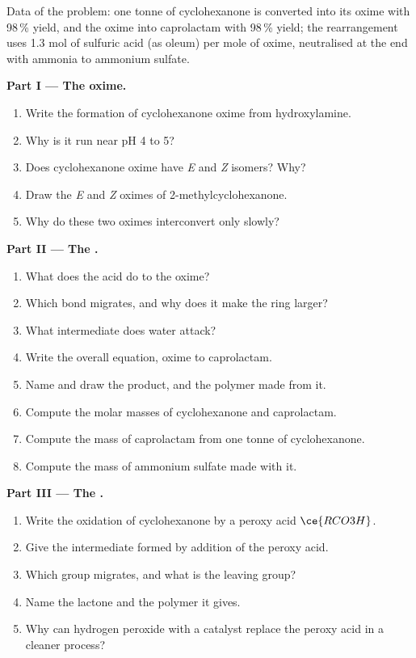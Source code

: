 \begin{problem}
\label{pb:b3:radicals-carbenes:1}
Data of the problem: one tonne of cyclohexanone is converted into its oxime with
98\,\% yield, and the oxime into caprolactam with 98\,\% yield; the rearrangement uses
1.3 mol of sulfuric acid (as oleum) per mole of oxime, neutralised at the end with
ammonia to ammonium sulfate.

\medskip\noindent\textbf{Part I --- The oxime.}
\begin{enumerate}
  \item Write the formation of cyclohexanone oxime from hydroxylamine.
  \item Why is it run near pH 4 to 5?
  \item Does cyclohexanone oxime have \textit{E} and \textit{Z} isomers? Why?
  \item Draw the \textit{E} and \textit{Z} oximes of 2-methylcyclohexanone.
  \item Why do these two oximes interconvert only slowly?
\end{enumerate}

\medskip\noindent\textbf{Part II --- The .}
\begin{enumerate}[resume]
  \item What does the acid do to the oxime?
  \item Which bond migrates, and why does it make the ring larger?
  \item What intermediate does water attack?
  \item Write the overall equation, oxime to caprolactam.
  \item Name and draw the product, and the polymer made from it.
  \item Compute the molar masses of cyclohexanone and caprolactam.
  \item Compute the mass of caprolactam from one tonne of cyclohexanone.
  \item Compute the mass of ammonium sulfate made with it.
\end{enumerate}

\medskip\noindent\textbf{Part III --- The .}
\begin{enumerate}[resume]
  \item Write the oxidation of cyclohexanone by a peroxy acid $\ce{RCO3H}$.
  \item Give the intermediate formed by addition of the peroxy acid.
  \item Which group migrates, and what is the leaving group?
  \item Name the lactone and the polymer it gives.
  \item Why can hydrogen peroxide with a catalyst replace the peroxy acid in a
        cleaner process?
\end{enumerate}


\end{problem}
